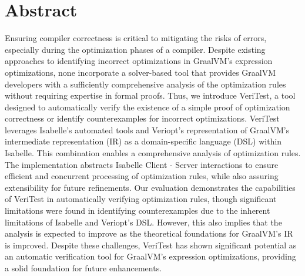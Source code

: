 \chapter*{Abstract \label{sec:abstract}}

Ensuring compiler correctness is critical to mitigating the risks of errors, especially during the optimization phases of a compiler. 
Despite existing approaches to identifying incorrect optimizations in GraalVM's expression optimizations, none incorporate a solver-based tool 
that provides GraalVM developers with a sufficiently comprehensive analysis of the optimization rules without requiring expertise in formal proofs. 
Thus, we introduce VeriTest, a tool designed to automatically verify the existence of a simple proof of optimization correctness or identify 
counterexamples for incorrect optimizations. VeriTest leverages Isabelle's automated tools and Veriopt's representation of GraalVM's intermediate 
representation (IR) as a domain-specific language (DSL) within Isabelle. This combination enables a comprehensive analysis of optimization rules. 
The implementation abstracts Isabelle Client - Server interactions to ensure efficient and concurrent processing of optimization rules, while also 
assuring extensibility for future refinements. Our evaluation demonstrates the capabilities of VeriTest in automatically verifying optimization 
rules, though significant limitations were found in identifying counterexamples due to the inherent limitations of Isabelle and Veriopt's DSL. However, 
this also implies that the analysis is expected to improve as the theoretical foundations for GraalVM's IR is improved.
Despite these challenges, VeriTest has shown significant potential as an automatic verification tool for GraalVM's expression optimizations, 
providing a solid foundation for future enhancements.